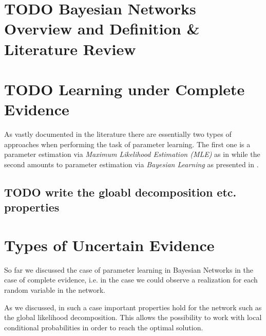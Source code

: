 \documentclass[11pt]{article}
\begin{document}
\begin{article}

\maketitle

\newpage

\tableofcontents

\newpage

\listoffigures
\listofalgorithms
\listoftables

\newpage

\section{{\bfseries\sffamily TODO} Bayesian Networks Overview and Definition \& Literature Review}
\label{sec:orgccd32da}


\section{{\bfseries\sffamily TODO} Learning under Complete Evidence}
\label{complete-learning}
As vastly documented in the literature there are essentially two
types of approaches when performing the task of parameter
learning. The first one is a parameter estimation via \emph{Maximum
Likelihood Estimation (MLE)} as in \cite{Myung_2003} while the second
amounts to parameter estimation via \emph{Bayesian Learning} as presented
in \cite{Smith_2001}.


\subsection{{\bfseries\sffamily TODO} write the gloabl decomposition etc. properties}
\label{sec:org7321e90}


\section{Types of Uncertain Evidence}
\label{sec:orge076ee1}

So far we discussed the case of parameter learning in Bayesian
Networks in the case of complete evidence, i.e. in the case we could
observe a realization for each random variable in the network.

As we discussed, in such a case important properties hold for the
network such as the global likelihood decomposition. This allows the
possibility to work with local conditional probabilities in order to
reach the optimal solution.


\end{article}
\end{document}
